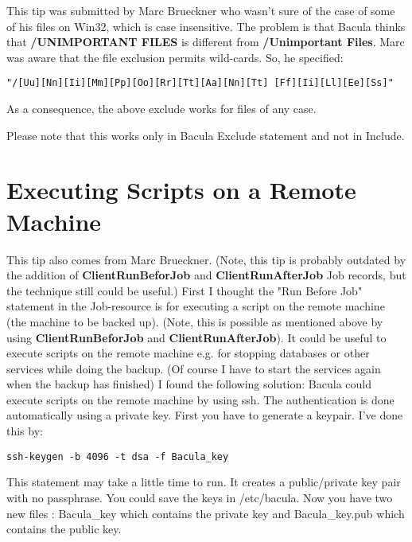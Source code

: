 This tip was submitted by Marc Brueckner who wasn't sure of the case of some
of his files on Win32, which is case insensitive. The problem is that Bacula
thinks that {\bf /UNIMPORTANT FILES} is different from {\bf /Unimportant
Files}. Marc was aware that the file exclusion permits wild-cards. So, he
specified: 

\footnotesize
\begin{verbatim}
"/[Uu][Nn][Ii][Mm][Pp][Oo][Rr][Tt][Aa][Nn][Tt] [Ff][Ii][Ll][Ee][Ss]"
\end{verbatim}
\normalsize

As a consequence, the above exclude works for files of any case. 

Please note that this works only in Bacula Exclude statement and not in
Include. 

\section{Executing Scripts on a Remote Machine}
\label{RemoteExecution}

This tip also comes from Marc Brueckner. (Note, this tip is probably outdated
by the addition of {\bf ClientRunBeforJob} and {\bf ClientRunAfterJob} Job
records, but the technique still could be useful.) First I thought the "Run
Before Job" statement in the Job-resource is for executing a script on the
remote machine (the machine to be backed up). (Note, this is possible as mentioned
above by using {\bf ClientRunBeforJob} and {\bf ClientRunAfterJob}).
It could be useful to execute
scripts on the remote machine e.g. for stopping databases or other services
while doing the backup. (Of course I have to start the services again when the
backup has finished) I found the following solution: Bacula could execute
scripts on the remote machine by using ssh. The authentication is done
automatically using a private key. First you have to generate a keypair. I've
done this by: 

\footnotesize
\begin{verbatim}
ssh-keygen -b 4096 -t dsa -f Bacula_key
\end{verbatim}
\normalsize

This statement may take a little time to run. It creates a public/private key
pair with no passphrase. You could save the keys in /etc/bacula. Now you have
two new files : Bacula\_key which contains the private key and Bacula\_key.pub
which contains the public key. 

